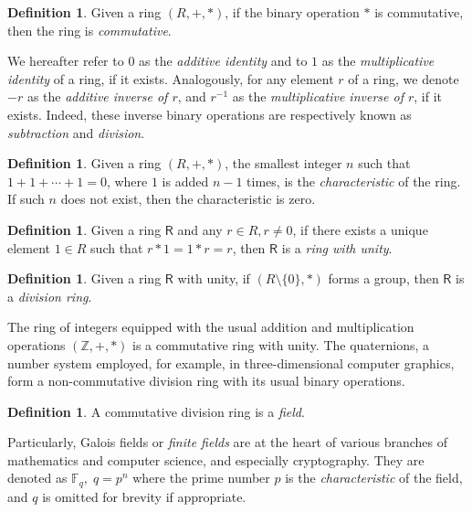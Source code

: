 \documentclass[english]{ufsc-thesis-rn46-2019/ufsc-thesis-rn46-2019}
\theoremstyle{definition}
\newtheorem{definition}[theorem]{Definition}
\begin{document}
\begin{definition}
  Given a ring $(R, +, \ast)$, if the binary operation $\ast$ is commutative,
  then the ring is \emph{commutative}.
\end{definition}

We hereafter refer to $0$ as the \emph{additive identity} and to $1$ as the
\emph{multiplicative identity} of a ring, if it exists. Analogously, for any
element $r$ of a ring, we denote $-r$ as the \emph{additive inverse of $r$},
and $r^{-1}$ as the \emph{multiplicative inverse of $r$}, if it exists. Indeed,
these inverse binary operations are respectively known as \emph{subtraction}
and \emph{division}.

\begin{definition}
  Given a ring $(R, +, \ast)$, the smallest integer $n$ such that
  $1 + 1 + \cdots + 1 = 0$, where $1$ is added $n - 1$ times, is the
  \emph{characteristic} of the ring. If such $n$ does not exist, then the
  characteristic is zero.
\end{definition}

\begin{definition}
  Given a ring $\mathsf{R}$ and any $r \in R, r \neq 0$, if there exists a
  unique element $1 \in R$ such that $r \ast 1 = 1 \ast r = r$, then
  $\mathsf{R}$ is a \emph{ring with unity}.
\end{definition}

\begin{definition}
  Given a ring $\mathsf{R}$ with unity, if $(R \setminus \{0\}, \ast)$ forms a
  group, then $\mathsf{R}$ is a \emph{division ring}.
\end{definition}

The ring of integers equipped with the usual addition and multiplication
operations $(\mathbb{Z}, +, \ast)$ is a commutative ring with unity. The
quaternions, a number system employed, for example, in three-dimensional
computer graphics, form a non-commutative division ring with its usual binary
operations.

\begin{definition}
  A commutative division ring is a \emph{field}.
\end{definition}

Particularly, Galois fields or \emph{finite fields} are at the heart of various
branches of mathematics and computer science, and especially cryptography. They
are denoted as $\mathbb{F}_{q},\; q = p^{n}$ where the prime number $p$ is the
\emph{characteristic} of the field, and $q$ is omitted for brevity if
appropriate.
\end{document}
